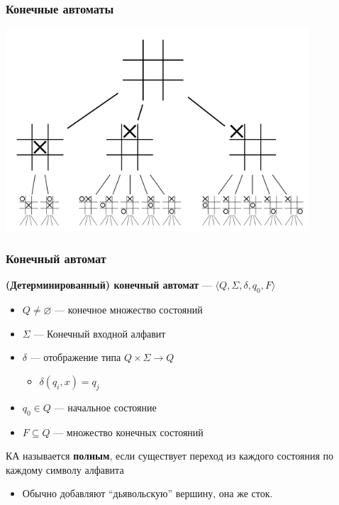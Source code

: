 \documentclass{beamer}
\begin{document}
\begin{frame}[fragile]
  \transwipe[direction=90]
  \frametitle{Конечные автоматы}
  \begin{center}
     \includegraphics[width=0.85\textwidth]{pics/tictac.jpg}
   \end{center}
\end{frame}

\begin{frame}[fragile]
  \transwipe[direction=90]
  \frametitle{Конечный автомат}
  \textbf{(Детерминированный) конечный автомат} --- $\langle Q, \Sigma, \delta, q_0, F \rangle$
  \begin{itemize}
    \item $Q \neq \varnothing$ --- конечное множество состояний
    \item $\Sigma$ --- Конечный входной алфавит
    \item $\delta$ --- отображение типа $Q \times \Sigma \to Q$
    \begin{itemize}
      \item $\delta(q_i, x) = q_j$
    \end{itemize}
    \item $q_0 \in Q$ --- начальное состояние
    \item $F \subseteq Q$ --- множество конечных состояний
  \end{itemize}

  КА называется \textbf{полным}, если существует переход из каждого состояния по каждому символу алфавита
\begin{itemize}
    \item Обычно добавляют ``дьявольскую'' вершину, она же сток.
\end{itemize}
\end{frame}
\end{document}
